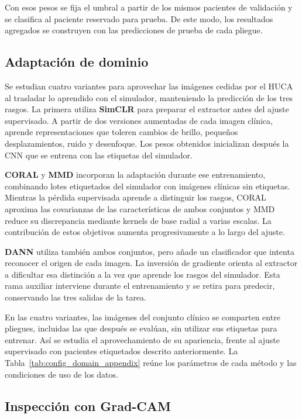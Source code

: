 Con esos pesos se fija el umbral a partir de los mismos pacientes de validación y se clasifica al paciente reservado para prueba. De este modo, los resultados agregados se construyen con las predicciones de prueba de cada pliegue.

\subsection{Adaptación de dominio}
\label{sec:adaptacion_cnn}

Se estudian cuatro variantes para aprovechar las imágenes cedidas por el HUCA al trasladar lo aprendido con el simulador, manteniendo la predicción de los tres rasgos. La primera utiliza \textbf{SimCLR} para preparar el extractor antes del ajuste supervisado. A partir de dos versiones aumentadas de cada imagen clínica, aprende representaciones que toleren cambios de brillo, pequeños desplazamientos, ruido y desenfoque. Los pesos obtenidos inicializan después la CNN que se entrena con las etiquetas del simulador.

\textbf{CORAL} y \textbf{MMD} incorporan la adaptación durante ese entrenamiento, combinando lotes etiquetados del simulador con imágenes clínicas sin etiquetas. Mientras la pérdida supervisada aprende a distinguir los rasgos, CORAL aproxima las covarianzas de las características de ambos conjuntos y MMD reduce su discrepancia mediante kernels de base radial a varias escalas. La contribución de estos objetivos aumenta progresivamente a lo largo del ajuste.

\textbf{DANN} utiliza también ambos conjuntos, pero añade un clasificador que intenta reconocer el origen de cada imagen. La inversión de gradiente orienta al extractor a dificultar esa distinción a la vez que aprende los rasgos del simulador. Esta rama auxiliar interviene durante el entrenamiento y se retira para predecir, conservando las tres salidas de la tarea.

En las cuatro variantes, las imágenes del conjunto clínico se comparten entre pliegues, incluidas las que después se evalúan, sin utilizar sus etiquetas para entrenar. Así se estudia el aprovechamiento de su apariencia, frente al ajuste supervisado con pacientes etiquetados descrito anteriormente. La Tabla~\ref{tab:config_domain_appendix} reúne los parámetros de cada método y las condiciones de uso de los datos.

\subsection{Inspección con Grad-CAM}

